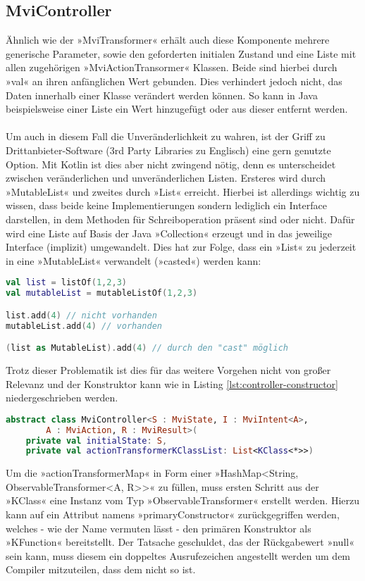 \subsection{MviController}
Ähnlich wie der »MviTransformer« erhält auch diese Komponente mehrere generische Parameter, sowie den geforderten initialen Zustand und eine Liste mit allen zugehörigen »MviActionTransormer« Klassen. Beide sind hierbei durch »val« an ihren anfänglichen Wert gebunden. Dies verhindert jedoch nicht, das Daten innerhalb einer Klasse verändert werden können. So kann in Java beispielsweise einer Liste ein Wert hinzugefügt oder aus dieser entfernt werden.
\\\\
Um auch in diesem Fall die Unveränderlichkeit zu wahren, ist der Griff zu Drittanbieter-Software (3rd Party Libraries zu Englisch) eine gern genutzte Option. Mit Kotlin ist dies aber nicht zwingend nötig, denn es unterscheidet zwischen veränderlichen und unveränderlichen Listen. Ersteres wird durch »MutableList« und zweites durch »List« erreicht. Hierbei ist allerdings wichtig zu wissen, dass beide keine Implementierungen sondern lediglich ein Interface darstellen, in dem  Methoden für Schreiboperation präsent sind oder nicht. Dafür wird eine Liste auf Basis der Java »Collection« erzeugt und in das jeweilige Interface (implizit) umgewandelt. Dies hat zur Folge, dass ein »List« zu jederzeit in eine »MutableList« verwandelt (»casted«) werden kann:
\begin{lstlisting}[caption={»List« und »MutableList«}, label={lst:list-and-mutable-list},language=Kotlin]
val list = listOf(1,2,3)
val mutableList = mutableListOf(1,2,3)

list.add(4) // nicht vorhanden
mutableList.add(4) // vorhanden

(list as MutableList).add(4) // durch den "cast" möglich
\end{lstlisting}
\bigskip
Trotz dieser Problematik ist dies für das weitere Vorgehen nicht von großer Relevanz und der Konstruktor kann wie in Listing
\ref{lst:controller-constructor}
niedergeschrieben werden.
\begin{lstlisting}[caption={Konsruktor}, label={lst:controller-constructor},language=Kotlin]
abstract class MviController<S : MviState, I : MviIntent<A>, 
		A : MviAction, R : MviResult>(
	private val initialState: S,
	private val actionTransformerKClassList: List<KClass<*>>)
\end{lstlisting}
\bigskip
Um die »actionTransformerMap« in Form einer »HashMap<String, ObservableTransformer<A, R>>« zu füllen, muss ersten Schritt aus der »KClass« eine Instanz vom Typ »ObservableTransformer« erstellt werden. Hierzu kann auf ein Attribut namens »primaryConstructor« zurückgegriffen werden, welches - wie der Name vermuten lässt - den primären Konstruktor als »KFunction« bereitstellt. Der Tatsache geschuldet, das der Rückgabewert »null« sein kann, muss diesem ein doppeltes Ausrufezeichen angestellt werden um dem Compiler mitzuteilen, dass dem nicht so ist.
